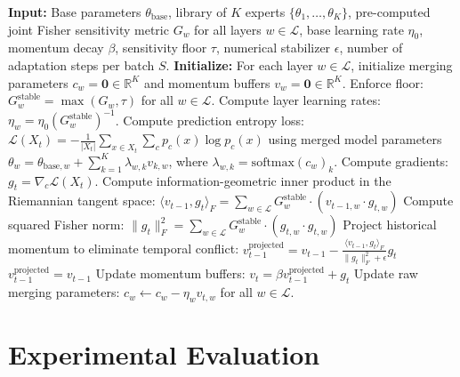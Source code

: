 \documentclass{article}
\theoremstyle{plain}
\theoremstyle{definition}
\theoremstyle{remark}
\begin{document}
\begin{algorithm}[H]
\caption{Temporal Momentum Surgery (TMS) for Test-Time Model Merging}
\label{alg:tms}
\begin{algorithmic}[1]
\STATE \textbf{Input:} Base parameters $\theta_{\text{base}}$, library of $K$ experts $\{\theta_1, \dots, \theta_K\}$, pre-computed joint Fisher sensitivity metric $G_w$ for all layers $w \in \mathcal{L}$, base learning rate $\eta_0$, momentum decay $\beta$, sensitivity floor $\tau$, numerical stabilizer $\epsilon$, number of adaptation steps per batch $S$.
\STATE \textbf{Initialize:} For each layer $w \in \mathcal{L}$, initialize merging parameters $c_w = \mathbf{0} \in \mathbb{R}^K$ and momentum buffers $v_w = \mathbf{0} \in \mathbb{R}^K$.
\STATE Enforce floor: $G_w^{\text{stable}} = \max(G_w, \tau)$ for all $w \in \mathcal{L}$.
\STATE Compute layer learning rates: $\eta_w = \eta_0 (G_w^{\text{stable}})^{-1}$.
        \STATE Compute prediction entropy loss: $\mathcal{L}(X_t) = -\frac{1}{|X_t|} \sum_{x \in X_t} \sum_{c} p_c(x) \log p_c(x)$ using merged model parameters $\theta_w = \theta_{\text{base}, w} + \sum_{k=1}^K \lambda_{w,k} v_{k,w}$, where $\lambda_{w,k} = \text{softmax}(c_w)_k$.
        \STATE Compute gradients: $g_t = \nabla_{c} \mathcal{L}(X_t)$.
        \STATE Compute information-geometric inner product in the Riemannian tangent space:
        \STATE \quad $\langle v_{t-1}, g_t \rangle_F = \sum_{w \in \mathcal{L}} G_w^{\text{stable}} \cdot (v_{t-1, w} \cdot g_{t, w})$
            \STATE Compute squared Fisher norm: $\|g_t\|_F^2 = \sum_{w \in \mathcal{L}} G_w^{\text{stable}} \cdot (g_{t, w} \cdot g_{t, w})$
            \STATE Project historical momentum to eliminate temporal conflict:
            \STATE \quad $v_{t-1}^{\text{projected}} = v_{t-1} - \frac{\langle v_{t-1}, g_t \rangle_F}{\|g_t\|_F^2 + \epsilon} g_t$
        \ELSE
            \STATE $v_{t-1}^{\text{projected}} = v_{t-1}$
        \ENDIF
        \STATE Update momentum buffers: $v_t = \beta v_{t-1}^{\text{projected}} + g_t$
        \STATE Update raw merging parameters: $c_w \leftarrow c_w - \eta_w v_{t, w}$ for all $w \in \mathcal{L}$.
    \ENDFOR
\ENDFOR
\end{algorithmic}
\end{algorithm}

\section{Experimental Evaluation}
\label{sec:experiments}
\end{document}
